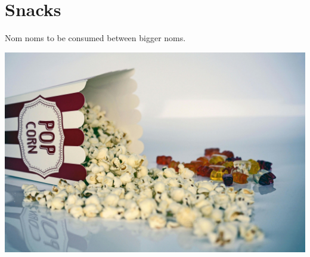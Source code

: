 \pagebreak
\chapter{Snacks}

Nom noms to be consumed between bigger noms.

\centering
\includegraphics[scale=0.08]{images/popcorn-cinema-ticket-film-122434.jpg}